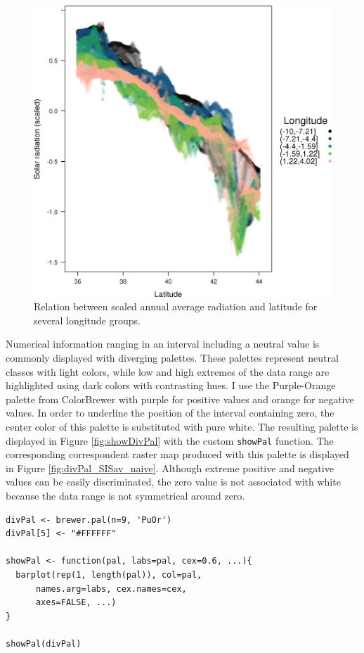\documentclass[smallroyalvopaper]{memoir}
\begin{document}
\begin{figure}[htb]
\centering
\includegraphics[width=.9\linewidth]{figs/xyplotSISav.png}
\caption{\label{fig:xyplotSISav}Relation between scaled annual average radiation and latitude for several longitude groups.}
\end{figure}

Numerical information ranging in an interval including a neutral
value is commonly displayed with diverging palettes. These
palettes represent neutral classes with light colors, while low
and high extremes of the data range are highlighted using dark
colors with contrasting hues. I use the Purple-Orange palette from
ColorBrewer with purple for positive values and orange for
negative values. In order to underline the position of the
interval containing zero, the center color of this palette is
substituted with pure white. The resulting palette is displayed in
Figure \ref{fig:showDivPal} with the custom \texttt{showPal}
function. The corresponding correspondent raster map produced with this palette
is displayed in Figure \ref{fig:divPal_SISav_naive}.  Although
extreme positive and negative values can be easily discriminated,
the zero value is not associated with white because the data range
is not symmetrical around zero.


\lstset{language=R,numbers=none}
\begin{lstlisting}
divPal <- brewer.pal(n=9, 'PuOr')
divPal[5] <- "#FFFFFF"

showPal <- function(pal, labs=pal, cex=0.6, ...){
  barplot(rep(1, length(pal)), col=pal,
	  names.arg=labs, cex.names=cex,
	  axes=FALSE, ...)
}

showPal(divPal)
\end{lstlisting}
\end{document}
